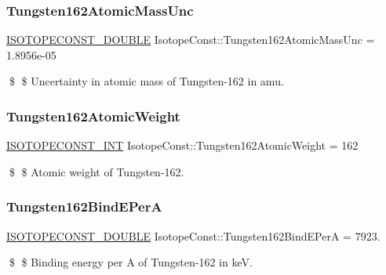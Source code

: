 \subsubsection{\texorpdfstring{Tungsten162\+Atomic\+Mass\+Unc}{Tungsten162AtomicMassUnc}}
{\footnotesize\ttfamily \mbox{\hyperlink{group___isotope_const-_macros_ga8f45a7272ce02c0b4c65c44636ed719a}{I\+S\+O\+T\+O\+P\+E\+C\+O\+N\+S\+T\+\_\+\+D\+O\+U\+B\+LE}} Isotope\+Const\+::\+Tungsten162\+Atomic\+Mass\+Unc = 1.\+8956e-\/05}

\$ \$ Uncertainty in atomic mass of Tungsten-\/162 in amu. \mbox{\label{group___isotope_const-_tungsten-_w162_gaea1873fe0e5d19ba12151a6e8ad7e041}} 
\subsubsection{\texorpdfstring{Tungsten162\+Atomic\+Weight}{Tungsten162AtomicWeight}}
{\footnotesize\ttfamily \mbox{\hyperlink{group___isotope_const-_macros_ga5f18360b3e99483a35c32d789e62621c}{I\+S\+O\+T\+O\+P\+E\+C\+O\+N\+S\+T\+\_\+\+I\+NT}} Isotope\+Const\+::\+Tungsten162\+Atomic\+Weight = 162}

\$ \$ Atomic weight of Tungsten-\/162. \mbox{\label{group___isotope_const-_tungsten-_w162_gae8cd7ab6fde927ac0d4ca404db695fba}} 
\subsubsection{\texorpdfstring{Tungsten162\+Bind\+E\+PerA}{Tungsten162BindEPerA}}
{\footnotesize\ttfamily \mbox{\hyperlink{group___isotope_const-_macros_ga8f45a7272ce02c0b4c65c44636ed719a}{I\+S\+O\+T\+O\+P\+E\+C\+O\+N\+S\+T\+\_\+\+D\+O\+U\+B\+LE}} Isotope\+Const\+::\+Tungsten162\+Bind\+E\+PerA = 7923.}

\$ \$ Binding energy per A of Tungsten-\/162 in keV. \mbox{\label{group___isotope_const-_tungsten-_w162_ga7ea430090841ffa1a40fb56615103997}} 
